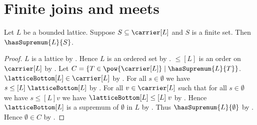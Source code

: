 \section{Finite joins and meets}





\begin{theorem}\label{finite_subset_has_supremum}
    Let $L$ be a bounded lattice.
    Suppose $S\subseteq\carrier[L]$ and $S$ is a finite set.
    Then $\hasSupremum{L}{S}$.
\end{theorem}
\begin{proof}
    $L$ is a lattice by .
    Hence $L$ is an ordered set by .
    $\leq[L]$ is an order on $\carrier[L]$ by
        .
    Let $C=\{T\in\pow{\carrier[L]}\mid
        \hasSupremum{L}{T}\}$.
    $\latticeBottom[L]\in\carrier[L]$ by .
    For all $s\in\emptyset$ we have
        $s\mathrel{\leq[L]}\latticeBottom[L]$ by .
    For all $v\in\carrier[L]$ such that
        for all $s\in\emptyset$ we have $s\mathrel{\leq[L]}v$ we have
        $\latticeBottom[L]\mathrel{\leq[L]}v$ by
        .
    Hence $\latticeBottom[L]$ is a supremum of $\emptyset$ in $L$ by
        .
    Thus $\hasSupremum{L}{\emptyset}$ by .
    Hence $\emptyset\in C$ by .


\end{proof}

